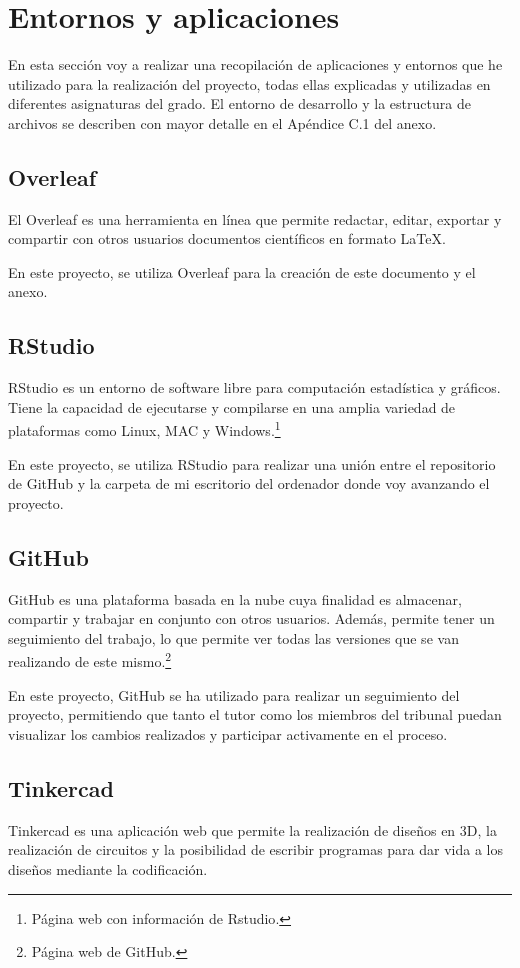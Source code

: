 \section{Entornos y aplicaciones}
En esta sección voy a realizar una recopilación de aplicaciones y entornos que he utilizado para la realización del proyecto, todas ellas explicadas y utilizadas en diferentes asignaturas del grado. El entorno de desarrollo y la estructura de archivos se describen con mayor detalle en el Apéndice C.1 del anexo.
\subsection{Overleaf}
El Overleaf es una herramienta en línea que permite redactar, editar, exportar y compartir con otros usuarios documentos científicos en formato LaTeX.

En este proyecto, se utiliza Overleaf para la creación de este documento y el anexo.
\subsection{RStudio}
RStudio es un entorno de software libre para computación estadística y gráficos. Tiene la capacidad de ejecutarse y compilarse en una amplia variedad de plataformas como Linux, MAC y Windows.\cite{Rstudio}\footnote{Página web con información de Rstudio\cite{Rstudio}.}

En este proyecto, se utiliza RStudio para realizar una unión entre el repositorio de GitHub y la carpeta de mi escritorio del ordenador donde voy avanzando el proyecto.
\subsection{GitHub}
GitHub es una plataforma basada en la nube cuya finalidad es almacenar, compartir y trabajar en conjunto con otros usuarios. 
Además, permite tener un seguimiento del trabajo, lo que permite ver todas las versiones que se van realizando de este mismo.\cite{GitHub}\footnote{Página web de GitHub\cite{GitHub}.} 

En este proyecto, GitHub se ha utilizado para realizar un seguimiento del proyecto, permitiendo que tanto el tutor como los miembros del tribunal puedan visualizar los cambios realizados y participar activamente en el proceso.
\subsection{Tinkercad}
Tinkercad es una aplicación web que permite la realización de diseños en 3D, la realización de circuitos y la posibilidad de escribir programas para dar vida a los diseños mediante la codificación.

